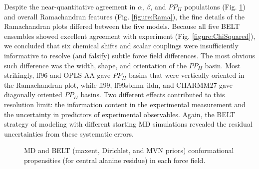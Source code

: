 \documentclass[12pt]{article}
\begin{document}
Despite the near-quantitative agreement in $\alpha$, $\beta$, and $PP_{II}$ populations (Fig. \ref{figure:ALA3}) and overall Ramachandran features (Fig. \ref{figure:Rama}), the fine details of the Ramachandran plots differed between the five models.  Because all five BELT ensembles showed excellent agreement with experiment (Fig. \ref{figure:ChiSquared}), we concluded that six chemical shifts and scalar couplings were insufficiently informative to resolve (and falsify) subtle force field differences.  The most obvious such difference was the width, shape, and orientation of the $PP_{II}$ basin.  Most strikingly, ff96 and OPLS-AA gave $PP_{II}$ basins that were vertically oriented in the Ramachandran plot, while ff99, ff99sbnmr-ildn, and CHARMM27 gave diagonally oriented $PP_{II}$ basins.  Two different effects contributed to this resolution limit: the information content in the experimental measurement and the uncertainty in predictors of experimental observables. Again, the BELT strategy of modeling with 
different starting MD simulations revealed the residual uncertainties from these systematic errors.


\begin{figure}

\caption{
MD and BELT (maxent, Dirichlet, and MVN priors) conformational propensities (for central alanine residue) in each force field.  
}
\label{figure:ALA3}
\end{figure}
\end{document}
